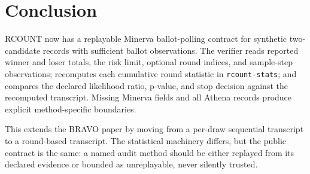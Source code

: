 \section{Conclusion}

RCOUNT now has a replayable Minerva ballot-polling contract for synthetic
two-candidate records with sufficient ballot observations. The verifier reads
reported winner and loser totals, the risk limit, optional round indices, and
sample-step observations; recomputes each cumulative round statistic in
\texttt{rcount-stats}; and compares the declared likelihood ratio, p-value, and
stop decision against the recomputed transcript. Missing Minerva fields and all
Athena records produce explicit method-specific boundaries.

This extends the BRAVO paper by moving from a per-draw sequential transcript to
a round-based transcript. The statistical machinery differs, but the public
contract is the same: a named audit method should be either replayed from its
declared evidence or bounded as unreplayable, never silently trusted.
